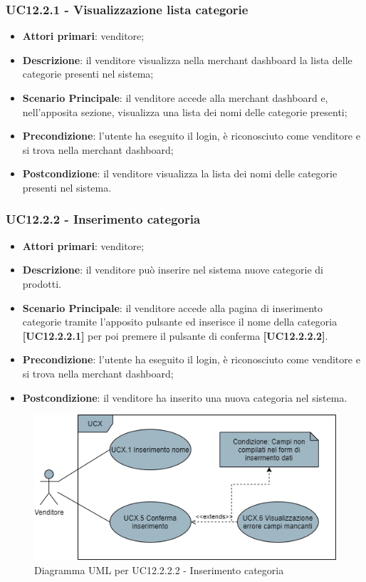 \subsubsection{UC12.2.1 - Visualizzazione lista categorie}
\begin{itemize}
\item \textbf{Attori primari}: venditore;
\item \textbf{Descrizione}: il venditore visualizza nella merchant dashboard la lista delle categorie presenti nel sistema;
\item \textbf{Scenario Principale}: il venditore accede alla merchant dashboard e, nell'apposita sezione, visualizza una lista dei nomi delle categorie presenti;
\item \textbf{Precondizione}: l'utente ha eseguito il login, è riconosciuto come venditore e si trova nella merchant dashboard;
\item \textbf{Postcondizione}: il venditore visualizza la lista dei nomi delle categorie presenti nel sistema.
\end{itemize}

\subsubsection{UC12.2.2 - Inserimento categoria}
\begin{itemize}
\item \textbf{Attori primari}: venditore;
\item \textbf{Descrizione}: il venditore può inserire nel sistema nuove categorie di prodotti.
\item \textbf{Scenario Principale}: il venditore accede alla pagina di inserimento categorie tramite l'apposito pulsante ed inserisce il nome della categoria \textbf{[UC12.2.2.1]} per poi premere il pulsante di conferma \textbf{[UC12.2.2.2]}.
\item \textbf{Precondizione}: l'utente ha eseguito il login, è riconosciuto come venditore e si trova nella merchant dashboard;
\item \textbf{Postcondizione}: il venditore ha inserito una nuova categoria nel sistema.
\end{itemize}

\begin{figure}[H]
\centering
\includegraphics[scale=0.6]{res/UseCase/Immagini/InserimentoCategoria}
\caption{Diagramma UML per UC12.2.2.2 - Inserimento categoria}
\end{figure}


